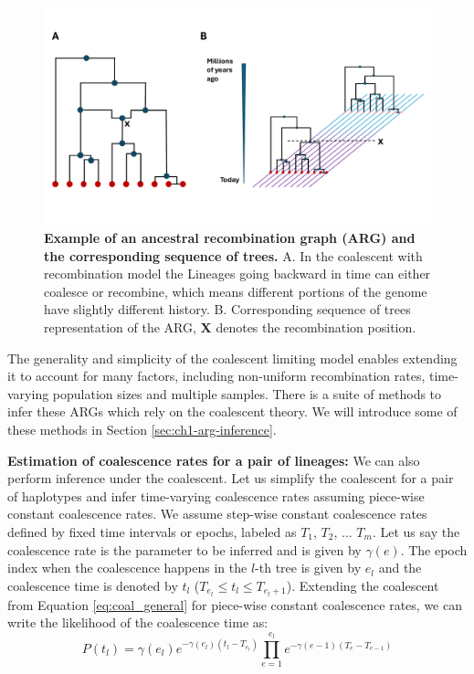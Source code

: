 \begin{figure}[h!]
    \centering
    \includegraphics[width=\linewidth]{figures/coalescent_arg.pdf}
    \caption{\textbf{Example of an ancestral recombination graph (ARG) and the corresponding sequence of trees.} A. In the coalescent with recombination model the Lineages going backward in time can either coalesce or recombine, which means different portions of the genome have slightly different history. B. Corresponding sequence of trees representation of the ARG, \textbf{X} denotes the recombination position.}
    \label{fig:arg}
\end{figure}

The generality and simplicity of the coalescent limiting model enables extending it to account for many factors, including non-uniform recombination rates, time-varying population sizes and multiple samples. There is a suite of methods to infer these ARGs which rely on the coalescent theory. We will introduce some of these methods in Section \ref{sec:ch1-arg-inference}.

\textbf{Estimation of coalescence rates for a pair of lineages:} We can also perform inference under the coalescent. Let us simplify the coalescent for a pair of haplotypes and infer time-varying coalescence rates assuming piece-wise constant coalescence rates. We assume step-wise constant coalescence rates defined by fixed time intervals or epochs, labeled as $T_{1}$,  $T_{2}$, ... $T_{m}$. Let us say the coalescence rate is the parameter to be inferred and is given by $\gamma(e)$. The epoch index when the coalescence happens in the $l$-th tree is given by $e_l$ and  the coalescence time is denoted by $t_l$ ($T_{e_l} \leq t_l \leq T_{e_{l} + 1} $). Extending the coalescent from Equation \ref{eq:coal_general} for piece-wise constant coalescence rates, we can write the likelihood of the coalescence time as:
\begin{equation}
    P(t_l) = \gamma(e_l) e^{  -\gamma(e_l) (t_l - T_{e_l}) } \prod_{e=1}^{e_l} e ^{  -\gamma(e - 1) (T_{e} - T_{e-1}) } 
\end{equation}

